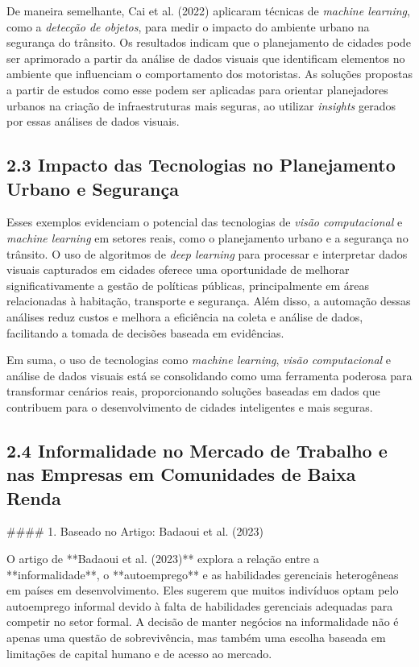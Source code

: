 \documentclass{article}
\begin{document}
De maneira semelhante, Cai et al. (2022) aplicaram técnicas de \textit{machine learning}, como a \textit{detecção de objetos}, para medir o impacto do ambiente urbano na segurança do trânsito. Os resultados indicam que o planejamento de cidades pode ser aprimorado a partir da análise de dados visuais que identificam elementos no ambiente que influenciam o comportamento dos motoristas. As soluções propostas a partir de estudos como esse podem ser aplicadas para orientar planejadores urbanos na criação de infraestruturas mais seguras, ao utilizar \textit{insights} gerados por essas análises de dados visuais.

\subsection*{2.3 Impacto das Tecnologias no Planejamento Urbano e Segurança}

Esses exemplos evidenciam o potencial das tecnologias de \textit{visão computacional} e \textit{machine learning} em setores reais, como o planejamento urbano e a segurança no trânsito. O uso de algoritmos de \textit{deep learning} para processar e interpretar dados visuais capturados em cidades oferece uma oportunidade de melhorar significativamente a gestão de políticas públicas, principalmente em áreas relacionadas à habitação, transporte e segurança. Além disso, a automação dessas análises reduz custos e melhora a eficiência na coleta e análise de dados, facilitando a tomada de decisões baseada em evidências.

Em suma, o uso de tecnologias como \textit{machine learning}, \textit{visão computacional} e análise de dados visuais está se consolidando como uma ferramenta poderosa para transformar cenários reais, proporcionando soluções baseadas em dados que contribuem para o desenvolvimento de cidades inteligentes e mais seguras.


\subsection*{2.4 Informalidade no Mercado de Trabalho e nas Empresas em Comunidades de Baixa Renda}

#### 1. Baseado no Artigo: Badaoui et al. (2023)

O artigo de **Badaoui et al. (2023)** explora a relação entre a **informalidade**, o **autoemprego** e as habilidades gerenciais heterogêneas em países em desenvolvimento. Eles sugerem que muitos indivíduos optam pelo autoemprego informal devido à falta de habilidades gerenciais adequadas para competir no setor formal. A decisão de manter negócios na informalidade não é apenas uma questão de sobrevivência, mas também uma escolha baseada em limitações de capital humano e de acesso ao mercado.
\end{document}
